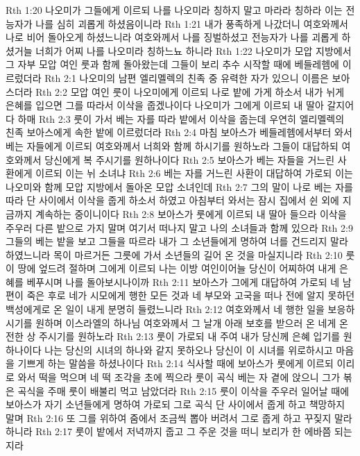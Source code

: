 Rth 1:20  나오미가 그들에게 이르되 나를 나오미라 칭하지 말고 마라라 칭하라 이는 전능자가 나를 심히 괴롭게 하셨음이니라
Rth 1:21  내가 풍족하게 나갔더니 여호와께서 나로 비어 돌아오게 하셨느니라 여호와께서 나를 징벌하셨고 전능자가 나를 괴롭게 하셨거늘 너희가 어찌 나를 나오미라 칭하느뇨 하니라
Rth 1:22  나오미가 모압 지방에서 그 자부 모압 여인 룻과 함께 돌아왔는데 그들이 보리 추수 시작할 때에 베들레헴에 이르렀더라
Rth 2:1  나오미의 남편 엘리멜렉의 친족 중 유력한 자가 있으니 이름은 보아스더라
Rth 2:2  모압 여인 룻이 나오미에게 이르되 나로 밭에 가게 하소서 내가 뉘게 은혜를 입으면 그를 따라서 이삭을 줍겠나이다 나오미가 그에게 이르되 내 딸아 갈지어다 하매
Rth 2:3  룻이 가서 베는 자를 따라 밭에서 이삭을 줍는데 우연히 엘리멜렉의 친족 보아스에게 속한 밭에 이르렀더라
Rth 2:4  마침 보아스가 베들레헴에서부터 와서 베는 자들에게 이르되 여호와께서 너희와 함께 하시기를 원하노라 그들이 대답하되 여호와께서 당신에게 복 주시기를 원하나이다
Rth 2:5  보아스가 베는 자들을 거느린 사환에게 이르되 이는 뉘 소녀냐
Rth 2:6  베는 자를 거느린 사환이 대답하여 가로되 이는 나오미와 함께 모압 지방에서 돌아온 모압 소녀인데
Rth 2:7  그의 말이 나로 베는 자를 따라 단 사이에서 이삭을 줍게 하소서 하였고 아침부터 와서는 잠시 집에서 쉰 외에 지금까지 계속하는 중이니이다
Rth 2:8  보아스가 룻에게 이르되 내 딸아 들으라 이삭을 주우러 다른 밭으로 가지 말며 여기서 떠나지 말고 나의 소녀들과 함께 있으라
Rth 2:9  그들의 베는 밭을 보고 그들을 따르라 내가 그 소년들에게 명하여 너를 건드리지 말라 하였느니라 목이 마르거든 그릇에 가서 소년들의 길어 온 것을 마실지니라
Rth 2:10  룻이 땅에 엎드려 절하며 그에게 이르되 나는 이방 여인이어늘 당신이 어찌하여 내게 은혜를 베푸시며 나를 돌아보시나이까
Rth 2:11  보아스가 그에게 대답하여 가로되 네 남편이 죽은 후로 네가 시모에게 행한 모든 것과 네 부모와 고국을 떠나 전에 알지 못하던 백성에게로 온 일이 내게 분명히 들렸느니라
Rth 2:12  여호와께서 네 행한 일을 보응하시기를 원하며 이스라엘의 하나님 여호와께서 그 날개 아래 보호를 받으러 온 네게 온전한 상 주시기를 원하노라
Rth 2:13  룻이 가로되 내 주여 내가 당신께 은혜 입기를 원하나이다 나는 당신의 시녀의 하나와 같지 못하오나 당신이 이 시녀를 위로하시고 마음을 기쁘게 하는 말씀을 하셨나이다
Rth 2:14  식사할 때에 보아스가 룻에게 이르되 이리로 와서 떡을 먹으며 네 떡 조각을 초에 찍으라 룻이 곡식 베는 자 곁에 앉으니 그가 볶은 곡식을 주매 룻이 배불리 먹고 남았더라
Rth 2:15  룻이 이삭을 주우러 일어날 때에 보아스가 자기 소년들에게 명하여 가로되 그로 곡식 단 사이에서 줍게 하고 책망하지 말며
Rth 2:16  또 그를 위하여 줌에서 조금씩 뽑아 버려서 그로 줍게 하고 꾸짖지 말라 하니라
Rth 2:17  룻이 밭에서 저녁까지 줍고 그 주운 것을 떠니 보리가 한 에바쯤 되는지라
